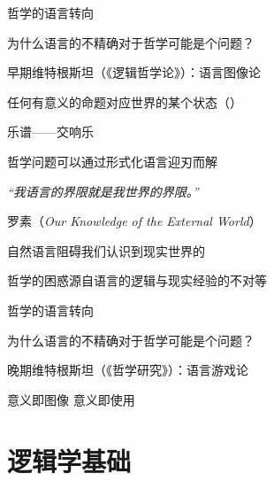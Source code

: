 \documentclass{zhslides}
\begin{document}
\begin{frame}[t]{哲学的语言转向}

  \vspace{2em}
  \begin{brainstorm*}{}
    为什么语言的不精确对于哲学可能是个问题？
  \end{brainstorm*}

  \pause
  
  \bit
    \item 早期维特根斯坦（《逻辑哲学论》）：语言图像论
      \bit
        \item 任何有意义的命题对应世界的某个状态（）
        \item 乐谱——交响乐
        \item 哲学问题可以通过形式化语言迎刃而解
        \item \textit{“我语言的界限就是我世界的界限。”}
      \eit
      \vspace{0.5em}
    \item 罗素（\textit{Our Knowledge of the External World}）
      \bit
        \item 自然语言阻碍我们认识到现实世界的
        \item 哲学的困惑源自语言的逻辑与现实经验的不对等
      \eit
  \eit

\end{frame}


\begin{frame}[t]{哲学的语言转向}

  \vspace{2em}
  \begin{brainstorm*}{}
    为什么语言的不精确对于哲学可能是个问题？
  \end{brainstorm*}

\bit
  \item 晚期维特根斯坦（《哲学研究》）：语言游戏论
    \bit
      \item 意义即图像 \raisebox{0.2ex}{$\longrightarrow$} 意义即使用
    \eit
\eit

\end{frame}






\section{逻辑学基础}
\end{document}
